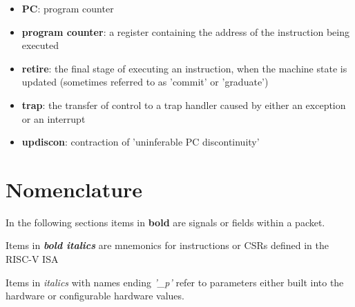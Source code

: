 \begin{itemize}
  \item \textbf{PC}: program counter
  \item \textbf{program counter}: a register containing the address of the instruction being executed
  \item \textbf{retire}: the final stage of executing an instruction, when the machine state is updated (sometimes referred to as 'commit' or 'graduate')
  \item \textbf{trap}: the transfer of control to a trap handler caused by either an exception or an interrupt
  \item \textbf{updiscon}: contraction of 'uninferable PC discontinuity'
\end{itemize}

\section{Nomenclature}

In the following sections items in \textbf{bold} are signals or
fields within a packet.

Items in \textbf{\textit{bold italics}} are mnemonics for instructions or CSRs defined in the RISC-V ISA

Items in \textit{italics} with names ending \textit{'\_p'} refer to parameters either built into the
hardware or configurable hardware values.


